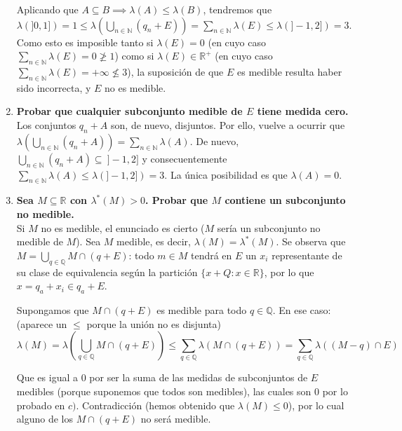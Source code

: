 \begin{enumerate}[label=\alph*)]
	Aplicando que $A \subseteq B \implies \lambda(A) \le \lambda(B)$, tendremos que $\displaystyle \lambda(]0, 1]) = 1 \le \lambda(\bigcup_{n \in \mathbb N} (q_n + E)) = \sum_{n \in \mathbb N} \lambda(E) \le \lambda(]-1, 2]) = 3$. Como esto es imposible tanto si $\lambda(E) = 0$ (en cuyo caso $\displaystyle \sum_{n \in \mathbb N} \lambda(E) = 0 \ngeq 1$) como si $\lambda(E) \in \mathbb R^+$ (en cuyo caso $\displaystyle \sum_{n \in \mathbb N} \lambda(E) = +\infty \nleq 3$), la suposición de que $E$ es medible resulta haber sido incorrecta, y $E$ no es medible.
	
	\item \textbf{Probar que cualquier subconjunto medible de $E$ tiene medida cero.} \\
	
	Los conjuntos $q_n + A$ son, de nuevo, disjuntos. Por ello, vuelve a ocurrir que $\displaystyle \lambda(\bigcup_{n \in \mathbb N} (q_n + A)) = \sum_{n \in \mathbb N} \lambda(A)$. De nuevo, $\displaystyle \bigcup_{n \in \mathbb N} (q_n + A) \subseteq \ ]-1, 2]$ y consecuentemente $\displaystyle \sum_{n \in \mathbb N} \lambda(A) \le \lambda(]-1, 2]) = 3$. La única posibilidad es que $\lambda(A) = 0$.
	
	\item \textbf{Sea $M \subseteq \mathbb R$ con $\lambda^*(M) > 0$. Probar que $M$ contiene un subconjunto no medible.} \\
	
	Si $M$ no es medible, el enunciado es cierto ($M$ sería un subconjunto no medible de $M$). Sea $M$ medible, es decir, $\lambda(M) = \lambda^*(M)$. Se observa que $\displaystyle M = \bigcup_{q \in \mathbb Q} M \cap (q + E)$: todo $m \in M$ tendrá en $E$ un $x_i$ representante de su clase de equivalencia según la partición $\{x + Q : x \in \mathbb R\}$, por lo que $x = q_a + x_i \in q_a + E$.
	
	Supongamos que $M\cap (q + E)$ es medible para todo $q \in \mathbb Q$. En ese caso: (aparece un $\le$ porque la unión no es disjunta)
	$$\displaystyle \lambda(M) = \lambda(\bigcup_{q \in \mathbb Q} M \cap (q + E)) \le \sum_{q \in \mathbb Q} \lambda(M \cap (q+E))  = \sum_{q \in \mathbb Q} \lambda((M-q) \cap E)$$
	
	Que es igual a $0$ por ser la suma de las medidas de subconjuntos de $E$ medibles (porque suponemos que todos son medibles), las cuales son $0$ por lo probado en $c)$. Contradicción (hemos obtenido que $\lambda(M) \le 0$), por lo cual alguno de los $M\cap (q + E)$ no será medible.
\end{enumerate}
 
